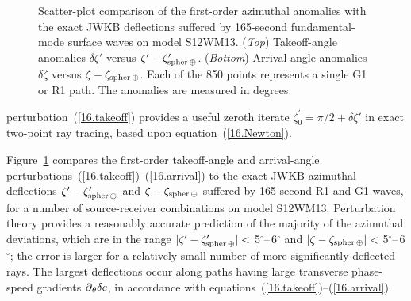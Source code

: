 \begin{figure}[!b]
\begin{center}
\end{center}
\caption[takeoff]{\label{fig:16.takeoff}
Scatter-plot comparison of the first-order azimuthal
anomalies with the exact JWKB deflections suffered by
165-second fundamental-mode surface waves on
model S12WM13.  ({\em Top\/}) Takeoff-angle
anomalies $\delta\zeta'$ versus
$\zeta'-\zeta^{\prime}_{\rm spher\,\oplus}$.
({\em Bottom\/}) Arrival-angle anomalies
$\delta\zeta$ versus $\zeta-\zeta_{\rm spher\,\oplus}$.
Each of the 850 points represents a single G1 or R1 path.
The anomalies are measured in degrees.}
\end{figure}
perturbation~(\ref{16.takeoff}) provides a useful zeroth
iterate $\zeta_0^{\prime}=\pi/2+\delta\zeta'$ in exact
two-point ray tracing, based upon equation~(\ref{16.Newton}).

Figure~\ref{fig:16.takeoff} compares the
first-order takeoff-angle and arrival-angle
perturbations~(\ref{16.takeoff})--(\ref{16.arrival})
to the exact JWKB azimuthal deflections
$\zeta'-\zeta_{\rm spher\,\oplus}^{\prime}$
and $\zeta-\zeta_{\rm spher\,\oplus}$ suffered
by 165-second R1 and G1 waves, for a number
of source-receiver combinations on model
S12WM13.  Perturbation theory provides a
reasonably accurate prediction of the majority
of the azimuthal deviations, which are in the range
$|\zeta'-\zeta_{\rm spher\,\oplus}^{\prime}|<$ 5$^\circ$--\,6$^\circ$
and $|\zeta-\zeta_{\rm spher\,\oplus}|<$ 5$^\circ$--\,6$^\circ$;
the error is larger for a relatively small number
of more significantly deflected rays.
The largest deflections occur along
paths having large transverse phase-speed
gradients $\mbox{$\partial$}_{\theta}\delta c$, in accordance
with equations~(\ref{16.takeoff})--(\ref{16.arrival}).

